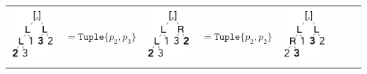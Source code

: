 \documentclass[a4paper,english]{lipics-v2019}
\newcommand{\xt}[1]{\texttt{#1}}
\newcommand{\tuple}[1]{\xt{Tuple\{}#1\xt{\}}}
\begin{document}
\medskip
{\small
\begin{tabular}{@{}l@{~}ll@{~}ll@{~}ll@{~}l}
\begin{minipage}{1.2cm}\includegraphics[scale=.25]{figures/tree2.pdf} 
\end{minipage} &  $ =   \tuple{p_2,p_3} $ &
\begin{minipage}{1.2cm}\includegraphics[scale=.25]{figures/tree3.pdf} 
\end{minipage} &  $ =   \tuple{p_2,p_2} $ 
&\begin{minipage}{1.2cm}\includegraphics[scale=.25]{figures/tree4.pdf} 

\end{minipage}
\end{tabular}}
\end{document}
